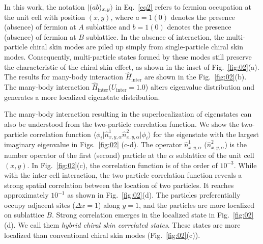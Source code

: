 \documentclass[longbibliography, aps, prx, amsmath, amssymb, amsfonts, twocolumn,superscriptaddress, footinbib]{revtex4-1}
\begin{document}
	In this work, the notation $\ket{(ab)_{x,y}}$ in Eq.~\ref{eq2} refers to fermion occupation at the unit cell with position $(x,y)$, where $a=1(0)$ denotes the presence (absence) of fermion at $A$ sublattice and $b=1(0)$ denotes the presence (absence) of fermion at $B$ sublattice.
	In the absence of interaction, the multi-particle chiral skin modes are piled up simply from single-particle chiral skin modes. Consequently, multi-particle states formed by these modes still preserve the characteristic of the chiral skin effect, as shown in the inset of Fig.~\ref{fig:02}(a).
	The results for many-body interaction $\hat{H}_{\text{inter}}$ are shown in the Fig.~\ref{fig:02}(b). The many-body interaction $\hat{H}_{\text{inter}}$($U_{\text{inter}}=1.0$) alters eigenvalue distribution and generates a more localized eigenstate distribution. 

	The many-body interaction resulting in the superlocalization of eigenstates can also be understood from the two-particle correlation function. 
	We show the two-particle correlation function $\langle \phi_i \vert \hat{n}^1_{x,y,\alpha} \hat{n}^2_{x,y,\alpha} \vert \phi_i \rangle$ for the eigenstate with the largest imaginary eigenvalue in Figs.~\ref{fig:02} (c-d). The operator $\hat{n}^1_{x,y,\alpha}$ ($\hat{n}^2_{x,y,\alpha}$) is the number operator of the first (second) particle at the $\alpha$ sublattice of the unit cell $(x,y)$.
	In Fig.~\ref{fig:02}(c), the correlation function is of the order of $10^{-3}$. While with the inter-cell interaction, the two-particle correlation function reveals a strong spatial correlation between the location of two particles. It reaches approximately $10^{-1}$ as shown in Fig.~\ref{fig:02}(d).
	The particles preferentially occupy adjacent sites ($\Delta x =1$) along $y=1$, and the particles are more localized on sublattice $B$. 
	Strong correlation emerges in the localized state in Fig.~\ref{fig:02}(d).  We call them \textit{hybrid chiral skin correlated states}. These states are more localized than conventional chiral skin modes (Fig.~\ref{fig:02}(c)).
	
\end{document}
